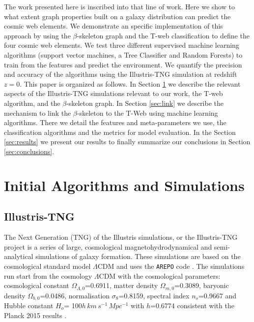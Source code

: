 \documentclass[usenatbib]{mnras}
\begin{document}
The work presented here is inscribed into that line of work.
Here we show to what extent graph properties built on a galaxy
distribution can predict the cosmic web elements.
We demonstrate an specific implementation of this approach by using
the $\beta$-skeleton graph \citep{Fang2019} and the  T-web
\citep{Forero-Romero2009} classification to define the four cosmic web
elements.  
We test three different supervised machine learning
algorithms (support vector machines, a Tree Classifier and Random Forests) 
to train from the features and predict the environment.
We quantify the precision and accuracy of the algorithms using the
Illustris-TNG simulation \citep{Nelson2015} at redshift $z=0$. 
This paper is organized as follows. 
In Section \ref{sec:init} we describe the relevant aspects of the Illustris-TNG
simulations relevant to our work, the T-web algorithm,
and the $\beta$-skeleton graph.
In Section \ref{sec:link} we describe the mechanism to link the
$\beta$-skeleton to the T-Web using machine learning algorithms.
There we detail the features and meta-parameters we use, the
classification algorithms and the metrics for model evaluation.  
In the Section \ref{sec:results} we present our results
to finally summarize our conclusions in Section
\ref{sec:conclusions}.


\section{Initial Algorithms and Simulations}\label{sec:init}

\subsection{Illustris-TNG}

The Next Generation (TNG) of the Illustris simulations, or the
Illustris-TNG project \citep{Nelson2015} is a series of large,
cosmological magnetohydrodynamical and semi-analytical simulations of galaxy formation. 
These simulations are based on the cosmological standard model
$\Lambda$CDM and uses the \texttt{AREPO} code \cite{Springel2011}.  The simulations run start from the cosmology $\Lambda$CDM with the cosmological parameters: cosmological constant $\Omega_{\Lambda,0}$=0.6911, matter density $\Omega_{m,0}$=0.3089,  baryonic density $\Omega_{b,0}$=0.0486, normalisation $\sigma_8$=0.8159, spectral index $n_s$=0.9667 and Hubble constant $H_o$= 100$h\,km\,s^{-1}\,Mpc^{-1}$ with $h$=0.6774 consistent with the Planck 2015 results \cite{Ade2016}. 
\end{document}
